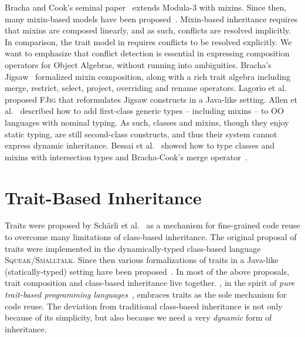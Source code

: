 Bracha and Cook's seminal paper~\citep{bracha1990mixin} extends Modula-3 with
mixins. Since then, many mixin-based models have been proposed~\citep{flatt1998classes,bono1999core, ancona2003jam}.
Mixin-based inheritance requires that mixins are composed linearly, and
as such, conflicts are resolved implicitly. In comparison, the trait
model in \namee requires conflicts to be resolved explicitly. We want to emphasize
that conflict detection is essential in expressing composition operators
for Object Algebras, without running into ambiguities. Bracha's
Jigsaw~\citep{bracha1992programming} formalized mixin composition, along with a rich
trait algebra including merge, restrict, select, project, overriding and rename operators.
Lagorio et al.~\citep{LAGORIO201286} proposed \textsc{FJig} that reformulates Jigsaw constructs
in a Java-like setting.
Allen et al.~\citep{DBLP:conf/oopsla/AllenBC03} described how to add first-class generic
types -- including mixins -- to OO languages with nominal typing.
As such, classes and mixins, though they enjoy static typing, are still second-class
constructs, and thus their system cannot express dynamic inheritance. Bessai et
al.~\citep{DBLP:journals/corr/BessaiDDCd15} showed how to type classes and mixins
with intersection types and Bracha-Cook's merge operator~\citep{bracha1990mixin}.


\section{Trait-Based Inheritance}


Traits were proposed by Sch{\"a}rli et al.~\citep{scharli2003traits, Ducasse_2006} as a mechanism
for fine-grained code reuse to overcome many limitations of class-based inheritance. The original proposal
of traits were implemented in the dynamically-typed class-based language \textsc{Squeak/Smalltalk}.
Since then various formalizations of traits in a Java-like (statically-typed) setting
have been proposed~\citep{fisher2004typed,scharli2003traitsformal,chai_trait, JOT:issue_2006_05/article4}.
In most of the above proposals, trait composition and class-based inheritance live together.
\namee, in the spirit of \textit{pure trait-based programming languages}~\citep{BETTINI2013521, BETTINI2017419}, embraces
traits as the sole mechanism for code reuse.
The deviation from traditional class-based inheritance is not only
because of its simplicity, but also because we need a very \emph{dynamic} form
of inheritance.

